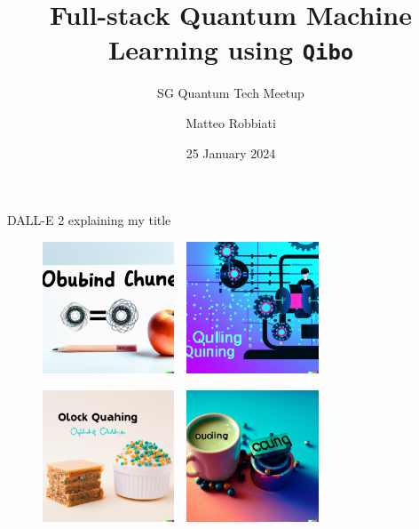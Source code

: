 \documentclass[8pt, xcolor={svgnames}, hyperref={linkcolor=black}]{beamer}
\title{Full-stack Quantum Machine Learning using \texttt{Qibo}}
\subtitle{SG Quantum Tech Meetup}
\date{25 January 2024}
\author[Matteo Robbiati]{Matteo Robbiati}
\begin{document}
\maketitle

\begin{frame}{DALL-E 2 explaining my title}
\begin{figure}  
    \includegraphics[width=0.35\textwidth]{figures/dalle1.png}%
    \,\,
    \includegraphics[width=0.35\textwidth]{figures/dalle2.png}

    \includegraphics[width=0.35\textwidth]{figures/dalle3.png}%
    \,\,
    \includegraphics[width=0.35\textwidth]{figures/dalle4.png}
\end{figure}
\end{frame}
\end{document}
